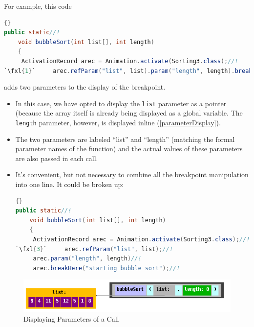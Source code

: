 \documentclass[11pt,titlepage]{book}
\def\fxl#1{%
\newdimen\fxlheight\setlength{\fxlheight}{#1\baselineskip}%
\advance\fxlheight by -0.5\baselineskip%
\begin{picture}(0,0)%
\setlength{\unitlength}{\baselineskip}%
\put(0,0){\makebox(0,0.75)[tl]{%
\colorbox{paleyellow}{%
\rule{0pt}{\fxlheight}%
\rule{\linewidth}{0pt}}%
}}\end{picture}%
}
\begin{document}
For example, this code
\begin{lstlisting}[language=Java,frame=tb]{}
public static//!
    void bubbleSort(int list[], int length)
    {
     ActivationRecord arec = Animation.activate(Sorting3.class);//!
`\fxl{1}`     arec.refParam("list", list).param("length", length).breakHere("starting bubble sort");//!
\end{lstlisting}
adds two parameters to the display of the breakpoint.
\begin{itemize}

\item In this case, we have opted to display the \texttt{list} parameter as a pointer (because the array itself is already being displayed as a global variable. The \texttt{length} parameter, however, is displayed inline (\autoref{parameterDisplay}).

\item The two
parameters are labeled ``list'' and ``length'' (matching the formal
parameter names of the function) and the actual values of these
parameters are also passed in each call.



\item It's convenient, but not necessary to combine all the breakpoint manipulation into one line.  It could be broken up:
\begin{lstlisting}[language=Java,frame=tb]{}
public static//!
    void bubbleSort(int list[], int length)
    {
     ActivationRecord arec = Animation.activate(Sorting3.class);//!
`\fxl{3}`     arec.refParam("list", list);//!
     arec.param("length", length)//!
     arec.breakHere("starting bubble sort");//!
\end{lstlisting}

\end{itemize}


\begin{figure}
  \begin{center}
    \includegraphics[scale=0.5]{images/parameterDisplay}
  \end{center}
  \caption{Displaying Parameters of a Call}\label{parameterDisplay}
  
\end{figure}
\end{document}
